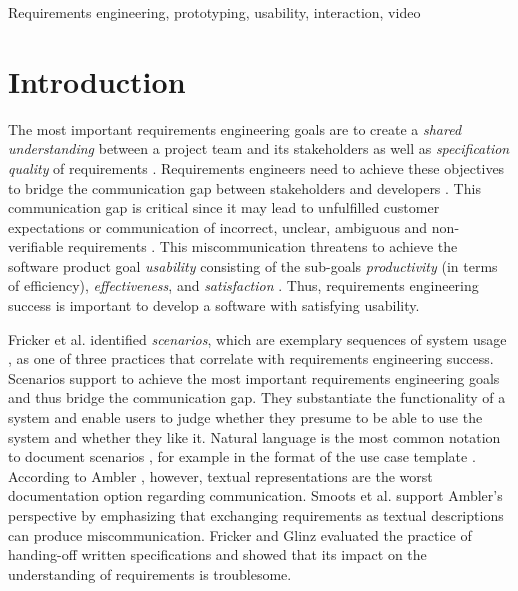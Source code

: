 \documentclass[conference]{IEEEtran}
\begin{document}
\begin{IEEEkeywords}
	Requirements engineering, prototyping, usability, interaction, video
\end{IEEEkeywords}

\IEEEpeerreviewmaketitle

\section{Introduction}
The most important requirements engineering goals are to create a 
\textit{shared understanding} between a project team and its stakeholders as 
well as \textit{specification quality} of requirements \cite{Fricker.2015c, 
Glinz.2015}. Requirements engineers need to achieve these objectives to bridge 
the communication gap between stakeholders and developers 
\cite{Gulliksen.2003}. This communication gap is critical since it may lead to 
unfulfilled customer expectations or communication of incorrect, unclear, 
ambiguous and non-verifiable requirements \cite{Bjarnason.2011}. This 
miscommunication threatens to achieve the software product goal 
\textit{usability} \cite{ISOIEC.1998} consisting of the sub-goals 
\textit{productivity} (in terms of efficiency), \textit{effectiveness}, and 
\textit{satisfaction} \cite{Fricker.2015c}. Thus, requirements engineering 
success is important to develop a software with satisfying usability.

Fricker et al. \cite{Fricker.2015c} identified \textit{scenarios}, which are 
exemplary sequences of system usage \cite{Alexander.2005}, as one 
of three practices that correlate with requirements engineering success. 
Scenarios support to achieve the most important requirements engineering goals 
and thus bridge the communication gap. They substantiate the functionality of a 
system and enable users to judge whether they presume to be able to use the 
system and whether they like it. Natural language is the most common notation 
to document scenarios \cite{Fricker.2015c, Alexander.2005}, for example in the 
format of the use case template \cite{Cockburn.2006}. According to Ambler 
\cite{Ambler.2002}, however, textual representations are the worst 
documentation option regarding communication. Smoots et al. \cite{Smoots.2016} 
support Ambler's perspective \cite{Ambler.2002} by emphasizing that exchanging 
requirements as textual descriptions can produce miscommunication. Fricker and 
Glinz \cite{Fricker.2010} evaluated the practice of handing-off written 
specifications and showed that its impact on the understanding of requirements 
is troublesome.
\end{document}
